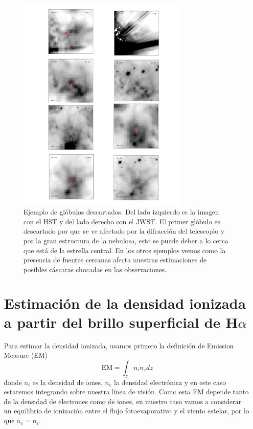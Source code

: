 \documentclass{book}
\begin{document}
\begin{figure}[htb]
    \centering
    \includegraphics[width=0.75\textwidth]{images Chapter 3/C3_badG.jpg}
    \caption{Ejemplo de glóbulos descartados. Del lado izquierdo es la imagen con el HST y del lado derecho con el JWST. El primer glóbulo es descartado por que se ve afectado por la difracción del telescopio y por la gran estructura de la nebulosa, esto se puede deber a lo cerca que está de la estrella central. En los otros ejemplos vemos como la presencia de fuentes cercanas afecta nuestras estimaciones de posibles cáscaras chocadas en las observaciones.}
    \label{Bad Globules}
\end{figure}


\section{Estimación de la densidad ionizada a partir del brillo superficial de H$\alpha$}\label{Sec : estimacion de densidad}

Para estimar la densidad ionizada, usamos primero la definición de Emission Measure (EM)
\[\mathrm{EM}=\int_z n_i n_edz\] donde $n_i$ es la densidad de iones, $n_e$ la densidad electrónica y en este caso estaremos integrando sobre nuestra línea de visión. Como esta EM depende tanto de la densidad de electrones como de iones, en nuestro caso vamos a considerar un equilibrio de ionización entre el flujo fotoevaporativo y el viento estelar, por lo que $n_e=n_i$.
\end{document}
